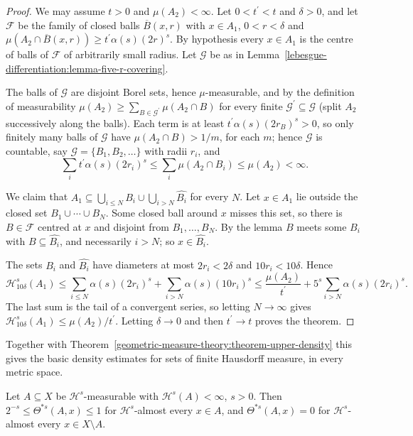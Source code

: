 \begin{proof}
We may assume $t > 0$ and $\mu(A_2) < \infty$. Let $0 < t^{\prime} < t$ and $\delta > 0$, and let $\mathcal{F}$ be the family of closed balls $\overline{B}(x, r)$ with $x \in A_1$, $0 < r < \delta$ and
$\mu(A_2 \cap \overline{B}(x, r)) \geq t^{\prime}\alpha(s)(2r)^s$. By hypothesis every $x \in A_1$ is the centre of balls of $\mathcal{F}$ of arbitrarily small radius. Let $\mathcal{G}$ be as in
Lemma~\ref{lebesgue-differentiation:lemma-five-r-covering}.

The balls of $\mathcal{G}$ are disjoint Borel sets, hence $\mu$-measurable, and by the definition of measurability $\mu(A_2) \geq \sum_{B \in \mathcal{G}^{\prime}}\mu(A_2 \cap B)$ for every finite
$\mathcal{G}^{\prime} \subseteq \mathcal{G}$ (split $A_2$ successively along the balls). Each term is at least $t^{\prime}\alpha(s)(2r_B)^s > 0$, so only finitely many balls of $\mathcal{G}$ have $\mu(A_2 \cap B) > 1/m$, for each
$m$; hence $\mathcal{G}$ is countable, say $\mathcal{G} = \{B_1, B_2, \ldots\}$ with radii $r_i$, and
\[
\sum_it^{\prime}\alpha(s)(2r_i)^s \leq \sum_i\mu(A_2 \cap B_i) \leq \mu(A_2) < \infty .
\]

We claim that $A_1 \subseteq \bigcup_{i \leq N}B_i \cup \bigcup_{i > N}\widehat{B_i}$ for every $N$. Let $x \in A_1$ lie outside the closed set $B_1 \cup \cdots \cup B_N$. Some closed ball around $x$ misses this set, so
there is $B \in \mathcal{F}$ centred at $x$ and disjoint from $B_1, \ldots, B_N$. By the lemma $B$ meets some $B_i$ with $B \subseteq \widehat{B_i}$, and necessarily $i > N$; so $x \in \widehat{B_i}$.

The sets $B_i$ and $\widehat{B_i}$ have diameters at most $2r_i < 2\delta$ and $10r_i < 10\delta$. Hence
\[
\mathcal{H}^s_{10\delta}(A_1) \leq \sum_{i \leq N}\alpha(s)(2r_i)^s + \sum_{i > N}\alpha(s)(10r_i)^s \leq \frac{\mu(A_2)}{t^{\prime}} + 5^s\sum_{i > N}\alpha(s)(2r_i)^s .
\]
The last sum is the tail of a convergent series, so letting $N \to \infty$ gives $\mathcal{H}^s_{10\delta}(A_1) \leq \mu(A_2)/t^{\prime}$. Letting $\delta \to 0$ and then $t^{\prime} \to t$ proves the theorem.
\end{proof}

Together with Theorem~\ref{geometric-measure-theory:theorem-upper-density} this gives the basic density estimates for sets of finite Hausdorff measure, in every metric space.

\begin{theorem}\label{geometric-measure-theory:theorem-density-bounds}
Let $A \subseteq X$ be $\mathcal{H}^s$-measurable with $\mathcal{H}^s(A) < \infty$, $s > 0$. Then $2^{-s} \leq \Theta^{*s}(A, x) \leq 1$ for $\mathcal{H}^s$-almost every $x \in A$, and $\Theta^{*s}(A, x) = 0$ for
$\mathcal{H}^s$-almost every $x \in X \setminus A$.
\end{theorem}

